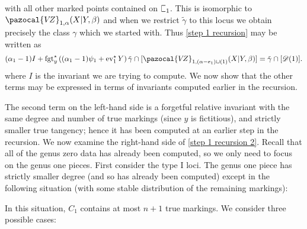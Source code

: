 \documentclass[11pt]{amsart}
\newcommand{\sqC}{\scalebox{0.8}[1.3]{$\sqsubset$}}
\newcommand{\VZ}{\pazocal{V\!Z}}
\newcommand{\st}{\star}
\newcommand{\ev}{\operatorname{ev}}
\newcommand{\fgt}{\operatorname{fgt}}
\newcommand{\Dcal}{\mathcal{D}}
\theoremstyle{definition}
\theoremstyle{definition}
\begin{document}
with all other marked points contained on $\sqC_1$. This is isomorphic to $\VZ_{1,\alpha}(X|Y,\beta)$ and when we restrict $\tilde\gamma$ to this locus we obtain precisely the class $\gamma$ which we started with. Thus \eqref{step 1 recursion} may be written as
\begin{equation} \label{step 1 recursion 2} (\alpha_1-1) I + \fgt_y^\st \left( (\alpha_1-1)\psi_1 + \ev_1^\st Y\right)  \tilde\gamma \cap [\VZ_{1,(\alpha-e_1)\cup(1)}(X|Y,\beta)] = \tilde\gamma \cap [\Dcal(1)]. \end{equation}
where $I$ is the invariant we are trying to compute. We now show that the other terms may be expressed in terms of invariants computed earlier in the recursion.

The second term on the left-hand side is a forgetful relative invariant with the same degree and number of true markings (since $y$ is fictitious), and strictly smaller true tangency; hence it has been computed at an earlier step in the recursion. We now examine the right-hand side of \eqref{step 1 recursion 2}. Recall that all of the genus zero data has already been computed, so we only need to focus on the genus one pieces. First consider the type I loci. The genus one piece has strictly smaller degree (and so has already been computed) except in the following situation (with some stable distribution of the remaining markings):
\begin{center}
\end{center}
In this situation, $C_1$ contains at most $n+1$ true markings. We consider three possible cases:
\end{document}
